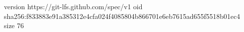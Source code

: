 version https://git-lfs.github.com/spec/v1
oid sha256:f833883e91a385312e4cfa024f4085804b866701e6eb7615ad655f5518b01ec4
size 76
